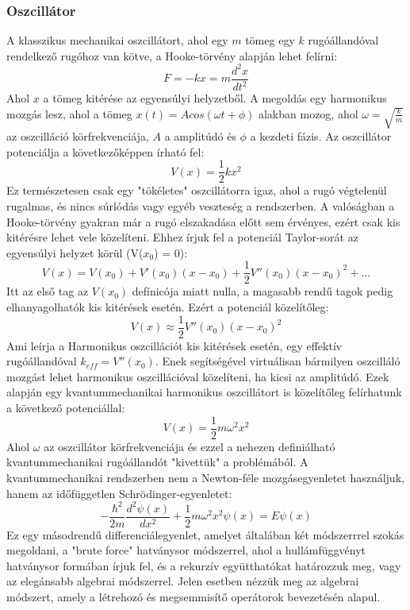 \documentclass[a4paper,12pt]{article}
\begin{document}
\subsubsection{Oszcillátor}
A klasszikus mechanikai oszcillátort, ahol egy  $m$ tömeg egy  $k$ rugóállandóval rendelkező rugóhoz van kötve,
a Hooke-törvény alapján lehet felírni:
\begin{equation}
    F = - k x = m \frac{d^2 x}{dt^2}
\end{equation}
Ahol $x$ a tömeg kitérése az egyensúlyi helyzetből. A megoldás egy harmonikus mozgás lesz, ahol a tömeg $x(t) = A cos(\omega t + \phi)$ alakban mozog,
ahol $\omega = \sqrt{\frac{k}{m}}$ az oszcilláció körfrekvenciája, $A$ a amplitúdó és $\phi$ a kezdeti fázis. Az oszcillátor potenciálja a következőképpen írható fel:
\begin{equation}
    V(x) = \frac{1}{2} k x^2
\end{equation}
Ez természetesen csak egy "tökéletes" oszcillátorra igaz, ahol a rugó végtelenül rugalmas, és nincs súrlódás vagy egyéb veszteség a rendszerben.
A valóságban a Hooke-törvény gyakran már a rugó elszakadása előtt sem érvényes, ezért csak kis kitérésre lehet vele közelíteni. 
Ehhez írjuk fel a potenciál Taylor-sorát az egyensúlyi helyzet körül (V($x_0$) = 0):
\begin{equation}
    V(x) = V(x_0) + V'(x_0) (x - x_0) + \frac{1}{2} V''(x_0) (x - x_0)^2 + \ldots
\end{equation}
Itt az első tag az $V(x_0)$ defínicója miatt nulla, a magasabb rendű tagok pedig elhanyagolhatók kis kitérések esetén. Ezért a potenciál közelítőleg:
\begin{equation}
    V(x) \approx \frac{1}{2} V''(x_0) (x - x_0)^2
\end{equation}
Ami leírja a Harmonikus oszcillációt kis kitérések esetén, egy effektív rugóállandóval $k_{eff} = V''(x_0)$. Enek segítségével
virtuálisan bármilyen oszcilláló mozgást lehet harmonikus oszcillációval közelíteni, ha kicsi az amplitúdó. 
\newline
\newline
Ezek alapján egy kvantummechanikai harmonikus oszcillátort is közelítőleg felírhatunk a következő potenciállal:
\begin{equation}
    V(x) = \frac{1}{2} m \omega^2 x^2
\end{equation}
Ahol $\omega$ az oszcillátor körfrekvenciája és ezzel a nehezen definiálható kvantummechanikai rugóállandót "kivettük" a problémából.
A kvantummechanikai rendszerben nem a Newton-féle mozgásegyenletet használjuk, hanem az időfüggetlen Schrödinger-egyenletet:
\begin{equation}
    -\frac{\hbar^2}{2m} \frac{d^2 \psi(x)}{dx^2} + \frac{1}{2} m \omega^2 x^2 \psi(x) = E \psi(x)
\end{equation}
Ez egy másodrendű differenciálegyenlet, amelyet általában két módszerrrel szokás megoldani, a "brute force" hatványsor módszerrel,
ahol a hullámfüggvényt hatványsor formában írjuk fel, és a rekurzív együtthatókat határozzuk meg, vagy az elegánsabb algebrai módszerrel.
Jelen esetben nézzük meg az algebrai módszert, amely a létrehozó és megsemmisítő operátorok bevezetésén alapul.
\end{document}
